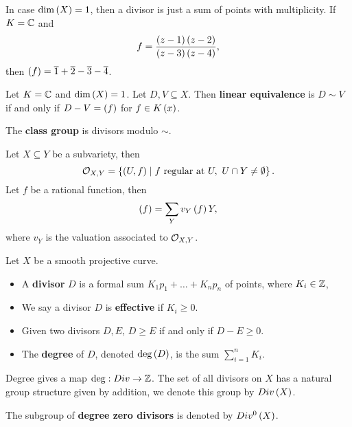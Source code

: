 \begin{example}
In case $ \dim\left( X \right) = 1 $, then a divisor is just a sum of points with multiplicity. If $ K = \mathbb{C} $ and
$$ f = \dfrac{\left( z - 1 \right)\left( z - 2 \right)}{\left( z - 3 \right)\left( z - 4 \right)}, $$
then $ \left( f \right) = \overline{1} + \overline{2} - \overline{3} - \overline{4} $.
\end{example}

\begin{definition}
Let $ K = \mathbb{C} $ and $ \dim\left( X \right) = 1 $. Let $ D, V \subseteq X $. Then \textbf{linear equivalence} is $ D \sim V $ if and only if $ D - V = \left( f \right) $ for $ f \in K\left( x \right) $.
\end{definition}

\begin{definition}
The \textbf{class group} is divisors modulo $ \sim $.
\end{definition}

\begin{definition}
Let $ X \subseteq Y $ be a subvariety, then
$$ \mathcal{O}_{X, Y} = \left\{ \left( U, f \right) \mid f \ \text{regular at} \ U, \ U \cap Y \ne \emptyset \right\}. $$
Let $ f $ be a rational function, then
$$ \left( f \right) = \sum_Y v_Y\left( f \right)Y, $$
where $ v_Y $ is the valuation associated to $ \mathcal{O}_{X, Y} $.
\end{definition}


\begin{definition}
Let $ X $ be a smooth projective curve.
\begin{itemize}
\item A \textbf{divisor} $ D $ is a formal sum $ K_1p_1 + \dots + K_np_n $ of points, where $ K_i \in \mathbb{Z} $,
\item We say a divisor $ D $ is \textbf{effective} if $ K_i \ge 0 $.
\item Given two divisors $ D, E $, $ D \ge E $ if and only if $ D - E \ge 0 $.
\item The \textbf{degree} of $ D $, denoted $ \deg\left( D \right) $, is the sum $ \sum_{i = 1}^n K_i $.
\end{itemize}
\end{definition}

\begin{remark}
Degree gives a map $ \deg : Div \to \mathbb{Z} $. The set of all divisors on $ X $ has a natural group structure given by addition, we denote this group by $ Div\left( X \right) $.
\end{remark}

\begin{notation}
The subgroup of \textbf{degree zero divisors} is denoted by $ Div^0\left( X \right) $.
\end{notation}


